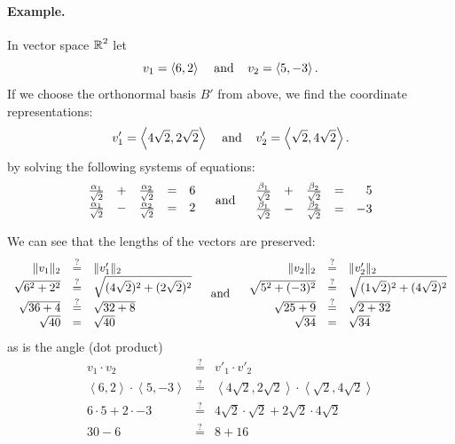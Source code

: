 \paragraph{Example.}
In vector space $\operatorname{\mathbb{R}}^2$ let \[v_1 = \left\langle6,2\right\rangle\;\;\;\;\textnormal{and}\;\;\;\; v_2 = \left\langle5,-3\right\rangle.\]
If we choose the orthonormal basis  $B'$ from above, 
we find the coordinate representations:
\[
v'_1 = \left\langle4\sqrt{2},2\sqrt{2}\right\rangle \;\;\;\;\textnormal{and}\;\;\;\; v'_2 = \left\langle\sqrt{2},4\sqrt{2}\right\rangle.
\]
by solving the following systems of equations: 
\[
\begin{array}{rcrcr}
\frac{\alpha_1}{\sqrt{2}} &+& \frac{\alpha_2}{\sqrt{2}} &=& 6\\
\frac{\alpha_1}{\sqrt{2}} &-& \frac{\alpha_2}{\sqrt{2}} &=& 2\\ 
\end{array} \;\;\;\;\textnormal{and}\;\;\;\; \begin{array}{rcrcr}
\frac{\beta_1}{\sqrt{2}} &+& \frac{\beta_2}{\sqrt{2}} &=& 5\\
\frac{\beta_1}{\sqrt{2}} &-& \frac{\beta_2}{\sqrt{2}} &=& -3\\ 
\end{array}\]

We can see that the lengths of the vectors are preserved: 
\[
\begin{array}{rcl}
\|v_1\|_2 & \stackrel{?}{=} & \|v'_1\|_2\\
\sqrt{6^2+2^2} & \stackrel{?}{=} & \sqrt{(4\sqrt{2})^2+(2\sqrt{2})^2}\\
\sqrt{36+4} & \stackrel{?}{=} & \sqrt{32 + 8}\\
\sqrt{40} & = & \sqrt{40}\\
\end{array}\;\;\;\;\textnormal{and}\;\;\;\; 
\begin{array}{rcl}
\|v_2\|_2 & \stackrel{?}{=} & \|v'_2\|_2\\
\sqrt{5^2+(-3)^2} & \stackrel{?}{=} & \sqrt{(1\sqrt{2})^2+(4\sqrt{2})^2}\\
\sqrt{25+9} & \stackrel{?}{=} & \sqrt{2 + 32}\\
\sqrt{34} & = & \sqrt{34}\\
\end{array} 
\]
as is the angle (dot product)
\[\begin{array}{rcl}
v_1 \cdot v_2 & \stackrel{?}{=} & v'_1 \cdot v'_2 \\
\left\langle6,2\right\rangle\cdot \left\langle5,-3\right\rangle&  \stackrel{?}{=}  & \left\langle4\sqrt{2},2\sqrt{2}\right\rangle\cdot\left\langle\sqrt{2},4\sqrt{2}\right\rangle\\
6\cdot5+2\cdot-3&  \stackrel{?}{=}  & 4\sqrt{2}\cdot\sqrt{2}+2\sqrt{2}\cdot4\sqrt{2}\\
30-6 &  \stackrel{?}{=}  & 8 + 16\\

\end{array} 
\]

